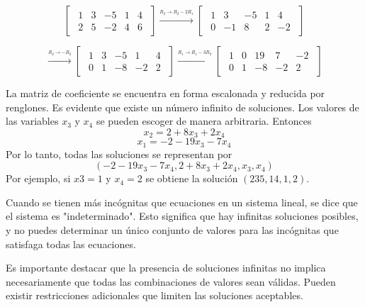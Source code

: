 \documentclass{article}
\begin{document}
\begin{equation*}
    \begin{bmatrix}
        \begin{array}{rrrr|r}
            1 & 3 & -5 & 1 & 4\\
            2 & 5 & -2 & 4 & 6
        \end{array}
    \end{bmatrix}
\xrightarrow{\stackrel{R_2 \rightarrow R_2 - 2R_1}{}}
    \begin{bmatrix}
        \begin{array}{rrrr|r}
            1 & 3 & -5 & 1 & 4\\
            0 & -1 & 8 & 2 & -2
        \end{array}
    \end{bmatrix}
\end{equation*}

\begin{equation*}
    \xrightarrow{\stackrel{R_2 \rightarrow -R_2}{}}
    \begin{bmatrix}
        \begin{array}{rrrr|r}
            1 & 3 & -5 & 1 & 4\\
            0 & 1 & -8 & -2 & 2
        \end{array}
    \end{bmatrix}
\xrightarrow{\stackrel{R_1 \rightarrow R_1 - 3R_2}{}}
    \begin{bmatrix}
        \begin{array}{rrrr|r}
            1 & 0 & 19 & 7 & -2\\
            0 & 1 & -8 & -2 & 2
        \end{array}
    \end{bmatrix}
\end{equation*}

La matriz de coeficiente se encuentra en forma escalonada y reducida por renglones. Es evidente que existe un número infinito de soluciones. Los valores de las variables $x_3$ y $x_4$ se pueden escoger de manera arbitraria. Entonces $$x_2 = 2 + 8x_3 + 2x_4$$ $$x_1 = -2 -19x_3 -7x_4$$ Por lo tanto, todas las soluciones se representan por $$(-2 -19x_3 -7x_4, 2 + 8x_3 + 2x_4, x_3, x_4)$$ Por ejemplo, si $x3 = 1$ y $x_4 = 2$ se obtiene la solución $(235, 14, 1, 2)$.

\begin{tcolorbox}[colback=green!20!white,colframe=green!80!black,title=Soluciones Infinitas]
    Cuando se tienen más incógnitas que ecuaciones en un sistema lineal, se dice que el sistema es "indeterminado". Esto significa que hay infinitas soluciones posibles, y no puedes determinar un único conjunto de valores para las incógnitas que satisfaga todas las ecuaciones.

    Es importante destacar que la presencia de soluciones infinitas no implica necesariamente que todas las combinaciones de valores sean válidas. Pueden existir restricciones adicionales que limiten las soluciones aceptables.
\end{tcolorbox}
\end{document}

